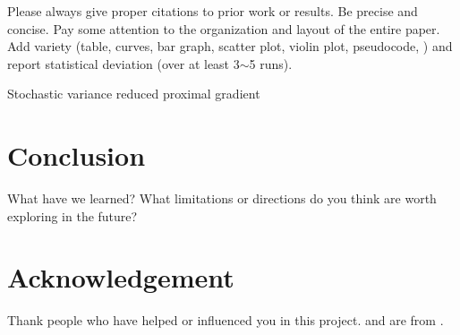 \documentclass{article}
\begin{document}
Please always give proper citations to prior work or results. Be precise and concise. Pay some attention to the organization and layout of the entire paper. Add variety (table, curves, bar graph, scatter plot, violin plot, pseudocode, \etc) and report statistical deviation (over at least 3$\sim$5 runs).

\begin{algorithm}[H]
	\DontPrintSemicolon
	\caption{Stochastic variance reduced proximal gradient}
\end{algorithm}


\section{Conclusion}
What have we learned? What limitations or directions do you think are worth exploring in the future?


\newpage

\section*{Acknowledgement}
Thank people who have helped or influenced you in this project.  and  are from \citet{LuSY24}.

\nocite{*}
\printbibliography[title=References]
\end{document}
